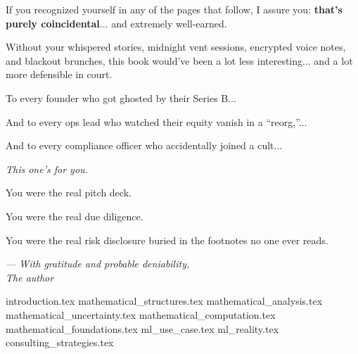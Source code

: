 \documentclass{article}
\begin{document}
  If you recognized yourself in any of the pages that follow, I assure you:  
  \textbf{that’s purely coincidental}... and extremely well-earned.

  Without your whispered stories, midnight vent sessions, encrypted voice notes, and blackout brunches,  
  this book would’ve been a lot less interesting... and a lot more defensible in court.

  To every founder who got ghosted by their Series B... 
  
  And to every ops lead who watched their equity vanish in a “reorg,”... 

  And to every compliance officer who accidentally joined a cult... 

  \textit{This one’s for you.}

  You were the real pitch deck.  

  You were the real due diligence.  

  You were the real risk disclosure buried in the footnotes no one ever reads.

  \begin{flushright}
  \textit{— With gratitude and probable deniability,}\\
  \textit{The author}
  \end{flushright}

  
  
  


  \tableofcontents

  \newpage


  {introduction.tex}
  {mathematical_structures.tex}
  {mathematical_analysis.tex}
  {mathematical_uncertainty.tex}
  {mathematical_computation.tex}
  {mathematical_foundations.tex}
  {ml_use_case.tex}
  {ml_reality.tex}
  {consulting_strategies.tex}
\end{document}
